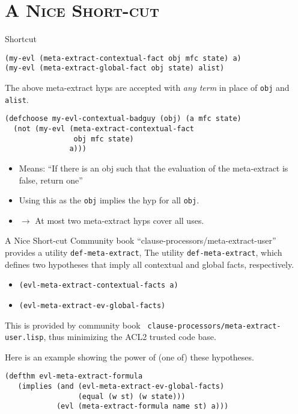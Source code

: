 \section[\scshape Shortcut]{\scshape A Nice Short-cut}
\begin{frame}[fragile] {Shortcut}
\begin{Verbatim}[fontsize=\small]
(my-evl (meta-extract-contextual-fact obj mfc state) a)
(my-evl (meta-extract-global-fact obj state) alist)
\end{Verbatim}
The above meta-extract hyps are accepted with \textit{any term} in place of \texttt{obj} and \texttt{alist}.
\begin{Verbatim}[fontsize=\small]
(defchoose my-evl-contextual-badguy (obj) (a mfc state)
  (not (my-evl (meta-extract-contextual-fact
                obj mfc state)
               a)))
\end{Verbatim}
\begin{itemize}
\item Means: ``If there is an obj such that the evaluation of the meta-extract is false, return one''
\item Using this as the \texttt{obj} implies the hyp for all \texttt{obj}.
\item $\rightarrow$ At most two meta-extract hyps cover all uses.
\end{itemize}
\end{frame}
\begin{frame}[fragile] {A Nice Short-cut}
Community book ``clause-processors/meta-extract-user'' provides a utility
\texttt{def-meta-extract}, 
The utility {\tt def-meta-extract}, which defines two
hypotheses that imply all contextual and global facts, respectively.

\begin{itemize}

\item {\tt (evl-meta-extract-contextual-facts a)}

\item {\tt (evl-meta-extract-ev-global-facts)}

\end{itemize}

This is provided by community book {\tt
  clause-processors/meta-extract-user.lisp}, thus minimizing the ACL2
trusted code base.

Here is an example showing the power of (one of) these hypotheses.

\begin{verbatim}
(defthm evl-meta-extract-formula
   (implies (and (evl-meta-extract-ev-global-facts)
                 (equal (w st) (w state)))
            (evl (meta-extract-formula name st) a)))
\end{verbatim}

\end{frame}
